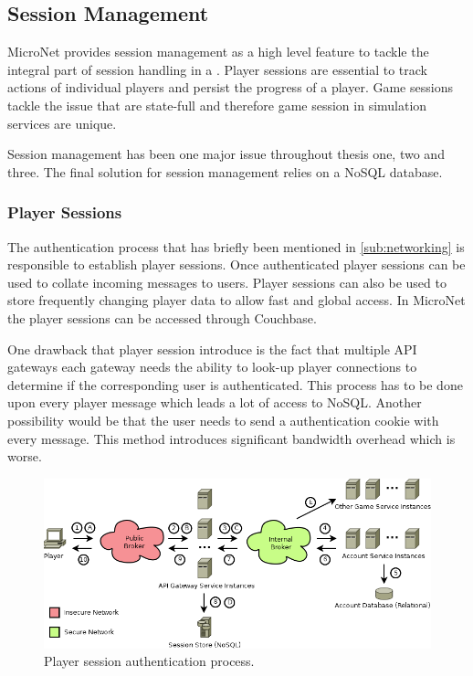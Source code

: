 \subsection{Session Management}

MicroNet provides session management as a high level feature to tackle the
integral part of session handling in a \og{}. Player sessions are essential to
track actions of individual players and persist the progress of a player. Game
sessions tackle the issue that \ogs{} are state-full and therefore game session
in simulation services are unique. 

Session management has been one major issue throughout thesis one, two and
three. The final solution for session management relies on a NoSQL database.




\subsubsection{Player Sessions}

The authentication process that has briefly been mentioned in
\autoref{sub:networking} is responsible to establish player sessions. Once
authenticated player sessions can be used to collate incoming messages to users.
Player sessions can also be used to store frequently changing player data to
allow fast and global access. In MicroNet the player sessions can be accessed
through Couchbase.

One drawback that player session introduce is the fact that multiple API
gateways each gateway needs the ability to look-up player connections to
determine if the corresponding user is authenticated. This process has to be
done upon every player message which leads a lot of access to NoSQL. Another
possibility would be that the user needs to send a authentication cookie with
every message. This method introduces significant bandwidth overhead which is
worse. 

\begin{figure}
	\centering
  	\includegraphics[width=\textwidth]{images/architecture/PlayerSessions}
	\caption{Player session authentication process.}
	\label{fig:player_sessions}
\end{figure}

